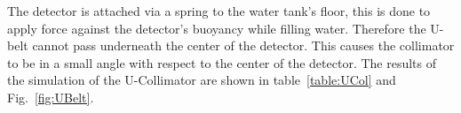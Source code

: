 The detector is attached via a spring to the water tank's floor, this is done to apply force against the detector's buoyancy while filling water. Therefore the U-belt cannot pass underneath the center of the detector. This causes the collimator to be in a small angle with respect to the center of the detector.
The results of the simulation of the U-Collimator are shown in table~\ref{table:UCol} and Fig.~\ref{fig:UBelt}. 



\begin{table}
\begin{center}
\label{table:UCol}
\end{center}
\end{table}


